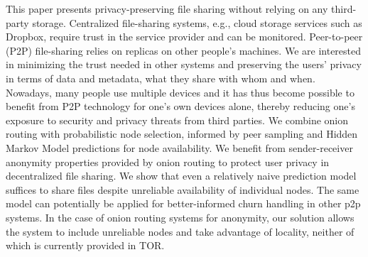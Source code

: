 %
This paper presents privacy-preserving file sharing without relying on any third-party storage. 
Centralized file-sharing systems, e.g.,  cloud storage services such as Dropbox, require trust in the service provider and can be monitored. Peer-to-peer (P2P) file-sharing relies on replicas on other people's machines. We are interested in minimizing the trust needed in other systems and preserving the users' privacy in terms of data and metadata, what they share with whom and when.
Nowadays, many people use multiple devices and it has thus become possible to benefit from P2P technology for one's own devices alone, thereby reducing one's exposure to security and privacy threats from third parties.
We combine onion routing with probabilistic node selection, informed by peer sampling and Hidden Markov Model predictions for node availability.
We benefit from sender-receiver anonymity properties provided by onion routing to protect user privacy in decentralized file sharing. We show that even a relatively naive prediction model suffices to share files despite unreliable availability of individual nodes. The same model can potentially be applied for better-informed churn handling in other p2p systems. In the case of onion routing systems for anonymity, our solution allows the system to include unreliable nodes and take advantage of locality, neither of which is currently provided in TOR.

